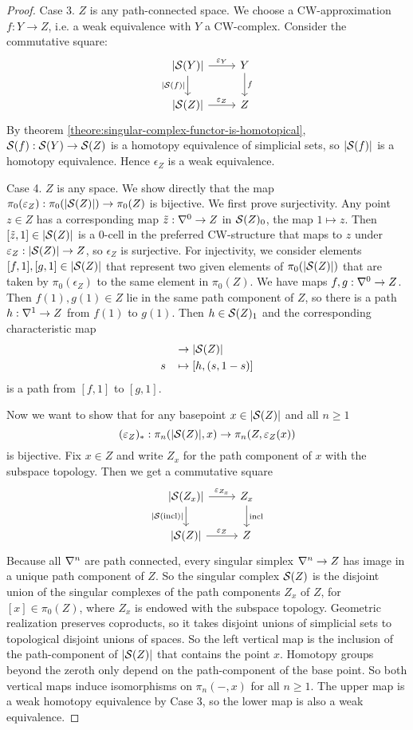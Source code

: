 \begin{proof}
Case 3. $Z$ is any path-connected space. We choose a CW-approximation $f:Y\to Z$, i.e. a weak equivalence with $Y$ a CW-complex. Consider the commutative square:
\[
\begin{tikzcd}
{|\S(Y)|} \ar[d,"{|\S(f)|}"'] \ar[r,"\epsilon_{Y}"] & Y \ar[d,"f"]\\
{|\S(Z)|} \ar[r,"\epsilon_Z"] & Z
\end{tikzcd}
\]
By theorem \ref{theore:singular-complex-functor-is-homotopical}, $\S(f):\S(Y)\to\S(Z)$ is a homotopy equivalence of simplicial sets, so $|\S(f)|$ is a homotopy equivalence. Hence $\epsilon_Z$ is a weak equivalence.

Case 4. $Z$ is any space. We show directly that the map $\pi_0(\epsilon_Z):\pi_0(|\S(Z)|)\to\pi_0(Z)$ is bijective. We first prove surjectivity. Any point $z\in Z$ has a corresponding map $\til z:\sx{0}\to Z$ in $\S(Z)_0$, the map $1\mapsto z$. Then $[\til z,1]\in |\S(Z)|$ is a $0$-cell in the preferred CW-structure that maps to $z$ under $\epsilon_Z:|\S(Z)|\to Z$, so $\epsilon_Z$ is surjective. For injectivity, we consider elements $[f,1],[g,1]\in|\S(Z)|$ that represent two given elements of $\pi_0(|\S(Z)|)$ that are taken by $\pi_0(\epsilon_Z)$ to the same element in $\pi_0(Z)$. We have maps $f,g:\sx{0}\to Z$. Then $f(1),g(1)\in Z$ lie in the same path component of $Z$, so there is a path $h:\sx{1}\to Z$ from $f(1)$ to $g(1)$. Then $h\in\S(Z)_1$ and the corresponding characteristic map
\begin{align*}
[0,1]&\to|\S(Z)|\\
s\ \ \,&\mapsto[h,(s,1-s)]
\end{align*}
is a path from $[f,1]$ to $[g,1]$.

Now we want to show that for any basepoint $x\in|\S(Z)|$ and all $n\ge1$
\[(\epsilon_Z)_*:\pi_n(|\S(Z)|,x)\to\pi_n(Z,\epsilon_Z(x))\]
is bijective. Fix $x\in Z$ and write $Z_x$ for the path component of $x$ with the subspace topology. Then we get a commutative square
\[
\begin{tikzcd}
{|\S(Z_x)|} \ar[d,"{|\S(\incl)|}"'] \ar[r,"\epsilon_{Z_x}"] & Z_x \ar[d,"\incl"]\\
{|\S(Z)|} \ar[r,"\epsilon_Z"] & Z
\end{tikzcd}
\]
Because all $\ns$ are path connected, every singular simplex $\ns\to Z$ has image in a unique path component of $Z$. So the singular complex $\S(Z)$ is the disjoint union of the singular complexes of the path components $Z_x$ of $Z$, for $[x]\in\pi_0(Z)$, where $Z_x$ is endowed with the subspace topology. Geometric realization preserves coproducts, so it takes disjoint unions of simplicial sets to topological disjoint unions of spaces. So the left vertical map is the inclusion of the path-component of $|\S(Z)|$ that contains the point $x$. Homotopy groups beyond the zeroth only depend on the path-component of the base point. So both vertical maps induce isomorphisms on $\pi_n(-,x)$ for all $n\ge1$. The upper map is a weak homotopy equivalence by Case 3, so the lower map is also a weak equivalence.
\end{proof}
